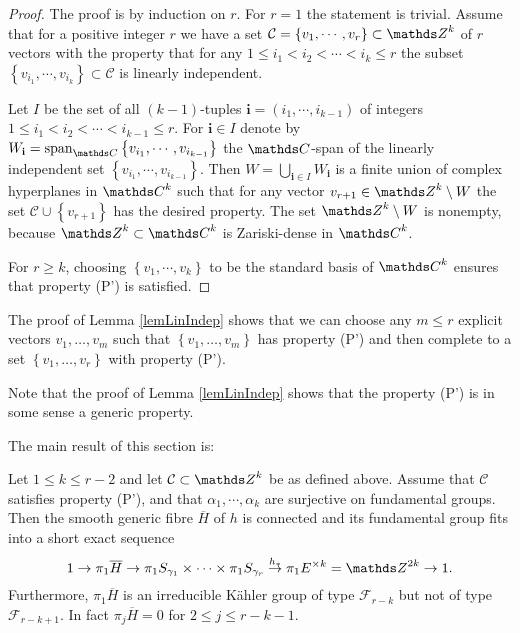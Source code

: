 \begin{proof}
The proof is by induction on $r$. For $r=1$ the statement is trivial. Assume that for a positive integer $r$ we have a set $\mathcal{C}=\left\{v_1,\cdots, v_r\right\}\subset \ZZ^k$ of $r$ vectors with the property that for any $1\leq i_1<i_2<\cdots <i_k\leq r$ the subset $\left\{v_{i_1},\cdots,v_{i_k}\right\}\subset \mathcal{C}$ is linearly independent.

 Let $I$ be the set of all $(k-1)$-tuples $\mathbf{i}=(i_1,\cdots, i_{k-1})$ of integers $1\leq i_1<i_2<\cdots <i_{k-1}\leq r$. For $\mathbf{i}\in I$ denote by $W_{\mathbf{i}}=\mathrm{span}_{\CC}\left\{v_{i_1},\cdots, v_{i_{k-1}}\right\}$ the $\CC$-span of the linearly independent set $\left\{v_{i_1},\cdots, v_{i_{k-1}}\right\}$. Then $W=\bigcup\limits_{\mathbf{i}\in I} W_{\textbf{i}}$ is a finite union of complex hyperplanes in $\CC^k$ such that for any vector $v_{r+1}\in \ZZ^k\setminus W$ the set $\mathcal{C}\cup \left\{v_{r+1}\right\}$ has the desired property. The set $\ZZ^k\setminus W$ is nonempty, because $\ZZ^k\subset \CC^k$ is Zariski-dense in $\CC^k$.
 
 For $r\geq k$, choosing $\left\{v_1,\cdots,v_k\right\}$ to be the standard basis of $\CC^k$ ensures that property (P') is satisfied.
\end{proof}

\begin{remark}
 The proof of Lemma \ref{lemLinIndep} shows that we can choose any $m\leq r$ explicit vectors $v_1,\dots, v_m$ such that $\left\{v_1,\dots,v_m\right\}$ has property (P') and then complete to a set $\left\{v_1,\dots,v_r\right\}$ with property (P').
\end{remark}

Note that the proof of Lemma \ref{lemLinIndep} shows that the property (P') is in some sense a generic property.

The main result of this section is:

\begin{theorem}
 Let $1\leq k \leq r-2$ and let $\mathcal{C}\subset \ZZ^k$ be as defined above. Assume that $\mathcal{C}$ satisfies property (P'), and that $\alpha_1,\cdots,\alpha_k$ are surjective on fundamental groups. Then the smooth generic fibre $\overline{H}$ of $h$ is connected and its fundamental group fits into a short exact sequence
 \[
  1\rightarrow \pi_1 \overline{H} \rightarrow \pi_1 S_{\g_1}\times \cdots \times \pi_1 S_{\g_r}\stackrel{h_{\ast}}{\rightarrow} \pi_1 E^{\times k} = \ZZ^{2k}\rightarrow 1.
 \]
 Furthermore, $\pi_1 \overline{H}$ is an irreducible K\"ahler group of type $\mathcal{F}_{r-k}$ but not of type $\mathcal{F}_{r-k+1}$. In fact $\pi_j \overline{H} = 0$ for $2\leq j \leq r-k-1$.
 \label{thmExsGenClass}
\end{theorem}

